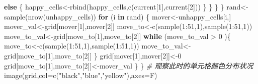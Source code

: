\documentclass[]{tufte-book}
\newenvironment{Shaded}{}{}
\newcommand{\AttributeTok}[1]{\textcolor[rgb]{0.49,0.56,0.16}{#1}}
\newcommand{\CommentTok}[1]{\textcolor[rgb]{0.38,0.63,0.69}{\textit{#1}}}
\newcommand{\ControlFlowTok}[1]{\textcolor[rgb]{0.00,0.44,0.13}{\textbf{#1}}}
\newcommand{\DecValTok}[1]{\textcolor[rgb]{0.25,0.63,0.44}{#1}}
\newcommand{\FunctionTok}[1]{\textcolor[rgb]{0.02,0.16,0.49}{#1}}
\newcommand{\NormalTok}[1]{#1}
\newcommand{\OtherTok}[1]{\textcolor[rgb]{0.00,0.44,0.13}{#1}}
\newcommand{\SpecialCharTok}[1]{\textcolor[rgb]{0.25,0.44,0.63}{#1}}
\newcommand{\StringTok}[1]{\textcolor[rgb]{0.25,0.44,0.63}{#1}}
\begin{document}
\begin{Shaded}
\begin{Highlighting}[]
                                \ControlFlowTok{else}\NormalTok{ \{}
\NormalTok{                                        happy\_cells}\OtherTok{\textless{}{-}}\FunctionTok{rbind}\NormalTok{(happy\_cells,}\FunctionTok{c}\NormalTok{(current[}\DecValTok{1}\NormalTok{],current[}\DecValTok{2}\NormalTok{]))}
\NormalTok{                                \}}
\NormalTok{                        \}}
\NormalTok{                \}}
\NormalTok{        \} }
\NormalTok{        rand}\OtherTok{\textless{}{-}}\FunctionTok{sample}\NormalTok{(}\FunctionTok{nrow}\NormalTok{(unhappy\_cells))}
        \ControlFlowTok{for}\NormalTok{ (i }\ControlFlowTok{in}\NormalTok{ rand) \{}
\NormalTok{                mover}\OtherTok{\textless{}{-}}\NormalTok{unhappy\_cells[i,]}
\NormalTok{                mover\_val}\OtherTok{\textless{}{-}}\NormalTok{grid[mover[}\DecValTok{1}\NormalTok{],mover[}\DecValTok{2}\NormalTok{]]}
\NormalTok{                move\_to}\OtherTok{\textless{}{-}}\FunctionTok{c}\NormalTok{(}\FunctionTok{sample}\NormalTok{(}\DecValTok{1}\SpecialCharTok{:}\DecValTok{51}\NormalTok{,}\DecValTok{1}\NormalTok{),}\FunctionTok{sample}\NormalTok{(}\DecValTok{1}\SpecialCharTok{:}\DecValTok{51}\NormalTok{,}\DecValTok{1}\NormalTok{))}
\NormalTok{                move\_to\_val}\OtherTok{\textless{}{-}}\NormalTok{grid[move\_to[}\DecValTok{1}\NormalTok{],move\_to[}\DecValTok{2}\NormalTok{]]}
                \ControlFlowTok{while}\NormalTok{ (move\_to\_val }\SpecialCharTok{\textgreater{}} \DecValTok{0}\NormalTok{ )\{}
\NormalTok{                        move\_to}\OtherTok{\textless{}{-}}\FunctionTok{c}\NormalTok{(}\FunctionTok{sample}\NormalTok{(}\DecValTok{1}\SpecialCharTok{:}\DecValTok{51}\NormalTok{,}\DecValTok{1}\NormalTok{),}\FunctionTok{sample}\NormalTok{(}\DecValTok{1}\SpecialCharTok{:}\DecValTok{51}\NormalTok{,}\DecValTok{1}\NormalTok{))}
\NormalTok{                        move\_to\_val}\OtherTok{\textless{}{-}}\NormalTok{grid[move\_to[}\DecValTok{1}\NormalTok{],move\_to[}\DecValTok{2}\NormalTok{]]}
\NormalTok{                \}}
\NormalTok{                grid[mover[}\DecValTok{1}\NormalTok{],mover[}\DecValTok{2}\NormalTok{]]}\OtherTok{\textless{}{-}}\DecValTok{0}
\NormalTok{                grid[move\_to[}\DecValTok{1}\NormalTok{],move\_to[}\DecValTok{2}\NormalTok{]]}\OtherTok{\textless{}{-}}\NormalTok{mover\_val}
\NormalTok{        \}}
\NormalTok{\}}
\CommentTok{\# 观察此时的单元格颜色分布状况}
\FunctionTok{image}\NormalTok{(grid,}\AttributeTok{col=}\FunctionTok{c}\NormalTok{(}\StringTok{"black"}\NormalTok{,}\StringTok{"blue"}\NormalTok{,}\StringTok{"yellow"}\NormalTok{),}\AttributeTok{axes=}\NormalTok{F)}
\end{Highlighting}
\end{Shaded}
\end{document}
